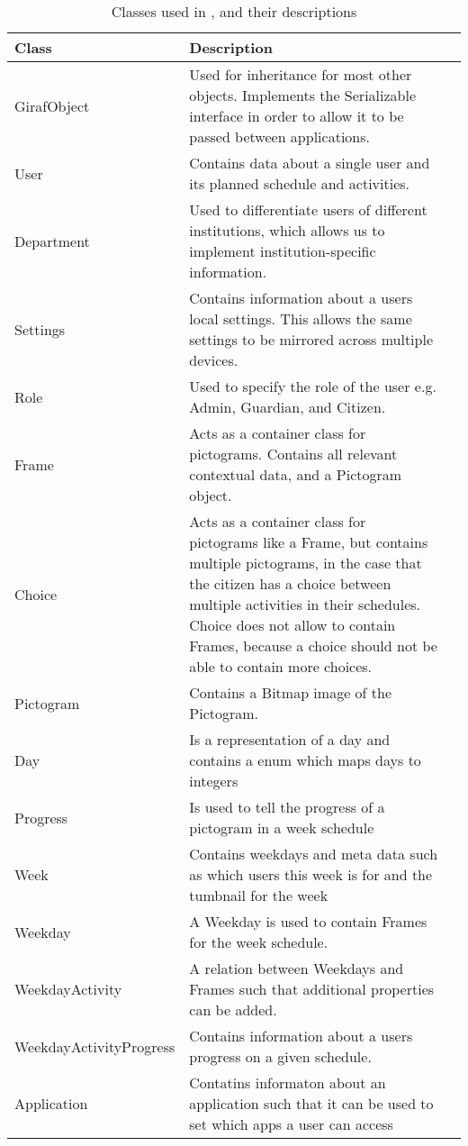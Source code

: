 \begin{table}[H] 
\begin{centering}
\begin{tabular}{|l|p{9cm}|l|}
\hline 
Class 					&	Description	\\ \hline
GirafObject				&	Used for inheritance for most other objects. Implements the
Serializable interface in order to allow it to be passed between applications. \\\hline 
User					&	Contains data about a single user and its planned
schedule and activities.\\\hline 
Department  			&	Used to differentiate users of
different institutions, which allows us to implement institution-specific information.\\\hline 
Settings    			&	Contains information about a users local settings. This allows
the same settings to be mirrored across multiple devices. \\\hline 
Role  			&	Used to specify the role of the user e.g. Admin,
Guardian, and Citizen.\\\hline 
Frame              		&   Acts as a container class for pictograms. Contains all
relevant contextual data, and a Pictogram object.\\\hline 
Choice              	&	Acts as a container class for pictograms like a Frame,
but contains multiple pictograms, in the case that the citizen has a choice between
multiple activities in their schedules. Choice does not allow to contain
Frames, because a choice should not be able to contain more choices.\\\hline
Pictogram & Contains a Bitmap image of the Pictogram.
\\\hline Day 					& 	Is a representation of a day and contains a enum which maps days
to integers \\\hline 
Progress 				& 	Is used to tell the progress of a pictogram in a week schedule
\\\hline 
Week 					& 	Contains weekdays and meta data such as which users this
week is for and the tumbnail for the week \\\hline 
Weekday              	&	A
Weekday is used to contain Frames for the week schedule.                  \\ \hline 
WeekdayActivity			& A relation between Weekdays and Frames such that additional
properties can be added.\\\hline 
WeekdayActivityProgress & 	Contains information about a users progress on a
given schedule.\\\hline 
Application    			&	Contatins informaton about an application such that it can
be used to set which apps a user can access\\\hline
\end{tabular}
\caption{Classes used in \rmlib, and their descriptions}\label{restModelTableEh}
\end{centering}
\end{table}

